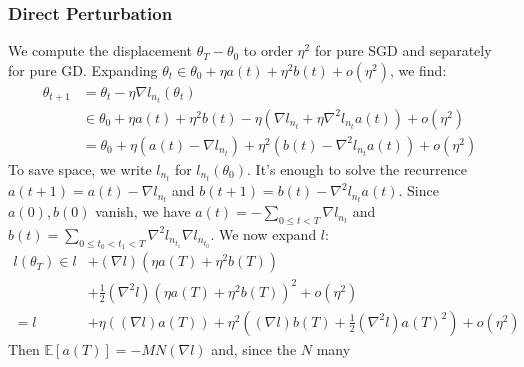\documentclass{article}
\theoremstyle{plain}
\theoremstyle{definition}
\newcommand{\expct}[1]{\mathbb{E}\left[#1\right]}
\begin{document}
        \subsubsection*{Direct Perturbation} 
        \begin{shaded}
            We compute the displacement $\theta_T-\theta_0$ to order $\eta^2$ 
            for pure SGD and separately for pure GD.  Expanding
            $
                \theta_t \in \theta_0 + \eta a(t) + \eta^2 b(t) + o(\eta^2)
            $, we find:
            \begin{align*}
                \theta_{t+1} &=     \theta_t - \eta \nabla l_{n_t} (\theta_t) \\
                             &\in       \theta_0
                                    +   \eta a(t) + \eta^2 b(t)
                                    -   \eta (
                                                \nabla l_{n_t}
                                            +   \eta \nabla^2 l_{n_t} a(t) 
                                        )
                                    +   o(\eta^2) \\
                             &=     \theta_0
                                +   \eta (a(t) - \nabla l_{n_t})
                                +   \eta^2 (b(t) - \nabla^2 l_{n_t} a(t)) 
                                +   o(\eta^2)
            \end{align*}
            To save space, we write $l_{n_t}$ for $l_{n_t}(\theta_0)$.  It's
            enough to solve the recurrence $a(t+1) = a(t) - \nabla l_{n_t}$ and
            $b(t+1) = b(t) - \nabla^2 l_{n_t} a(t)$.  Since $a(0), b(0)$
            vanish, we have $a(t) =-\sum_{0\leq t<T} \nabla l_{n_t}$ and $b(t)
            = \sum_{0\leq t_0 < t_1 < T} \nabla^2 l_{n_{t_1}} \nabla
            l_{n_{t_0}}$.  We now expand $l$:
            \begin{align*}
                l(\theta_T) \in    l   &+   (\nabla l) (\eta a(T) + \eta^2 b(T)) \\
                                       &+   \frac{1}{2} (\nabla^2 l) (\eta a(T) + \eta^2 b(T))^2
                                        +   o(\eta^2) \\
                            =      l   &+   \eta ((\nabla l) a(T))
                                        +   \eta^2 ((\nabla l) b(T) + \frac{1}{2} (\nabla^2 l) a(T)^2 )
                                        +   o(\eta^2)
            \end{align*}
            Then $\expct{a(T)} = -MN(\nabla l)$ and, since the $N$ many

\end{shaded}
\end{document}
